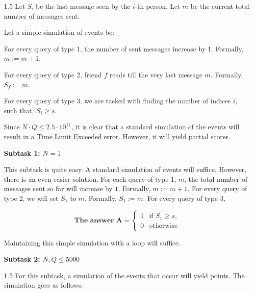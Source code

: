 \documentclass[12pt]{article}
\begin{document}
\begin{spacing}{1.5}
{\large
Let $S_i$ be the last message seen by the $i$-th person. Let $m$ be the current total number of messages sent.}

{\large Let a simple simulation of events be:}


{\large
For every query of type $1$, the number of sent messages increase by $1$. Formally, $m:=m+1$.
}


{\large For every query of type $2$, friend $f$ reads till the very last message $m$. Formally, $S_f := m$.}


{\large For every query of type $3$, we are tasked with finding the number of indices $i$, such that, $S_i \ge s$.}


{\large Since $N \cdot Q \le 2.5 \cdot 10^{11}$, it is clear that a standard simulation of the events will result in a Time Limit Exceeded error. However, it will yield partial scores.}

\vspace{0.3cm}

\textbf{\large Subtask 1: $N = 1$}

\vspace{0.3cm}

{\large This subtask is quite easy. A standard simulation of events will suffice. However, there is an even easier solution. For each query of type 1, $m$, the total number of messages sent so far will increase by $1$. Formally, $m := m + 1$. For every query of type 2, we will set $S_1$ to $m$. Formally, $S_1 := m$. For every query of type 3,}

\end{spacing}

\vspace{-0.8cm}

{\large 
\[
\textbf{The answer A} =
\begin{cases}
1 & \text{if } S_1 \ge s,\\
0 & \text{otherwise} 
\end{cases}
\]}

{\large Maintaining this simple simulation with a loop will suffice.}

\vspace{0.6cm}

\newpage

\textbf{\large Subtask 2: $N,Q \le 5000$}

\vspace{0.1cm}
\begin{spacing}{1.5}
{\large For this subtask, a simulation of the events that occur will yield points. The simulation goes as follows:}
\end{spacing}
\vspace{0.1cm}
\end{document}
